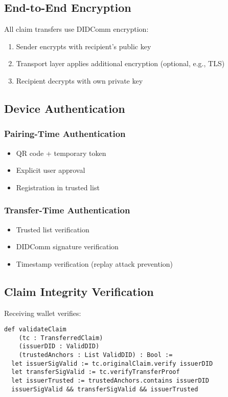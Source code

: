 \subsection{End-to-End Encryption}

All claim transfers use DIDComm encryption:

\begin{enumerate}
  \item Sender encrypts with recipient's public key
  \item Transport layer applies additional encryption (optional, e.g., TLS)
  \item Recipient decrypts with own private key
\end{enumerate}

\subsection{Device Authentication}

\subsubsection{Pairing-Time Authentication}

\begin{itemize}
  \item QR code + temporary token
  \item Explicit user approval
  \item Registration in trusted list
\end{itemize}

\subsubsection{Transfer-Time Authentication}

\begin{itemize}
  \item Trusted list verification
  \item DIDComm signature verification
  \item Timestamp verification (replay attack prevention)
\end{itemize}

\subsection{Claim Integrity Verification}

Receiving wallet verifies:

\begin{verbatim}
def validateClaim
    (tc : TransferredClaim)
    (issuerDID : ValidDID)
    (trustedAnchors : List ValidDID) : Bool :=
  let issuerSigValid := tc.originalClaim.verify issuerDID
  let transferSigValid := tc.verifyTransferProof
  let issuerTrusted := trustedAnchors.contains issuerDID
  issuerSigValid && transferSigValid && issuerTrusted
\end{verbatim}

